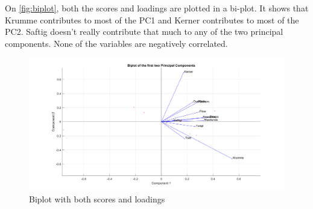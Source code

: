 On \autoref{fig:biplot}, both the scores and loadings are plotted in a bi-plot. It shows that Krumme contributes to most of the PC1 and Kerner contributes to most of the PC2. Saftig doesn't really contribute that much to any of the two principal components.
None of the variables are negatively correlated. 

\begin{figure}[H]
\centering
\includegraphics[width =\textwidth]{Figure/biplot}
\caption{Biplot with both scores and loadings}
\label{fig:biplot}
\end{figure}
\noindent



